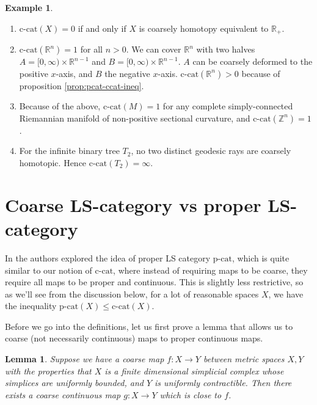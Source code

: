 \documentclass {amsart}
\newcommand {\ccat}     {\text{c-cat}}
\newcommand {\pcat}     {\text{p-cat}}
\newcommand {\R}        {\mathbb{R}}
\newcommand {\Z}        {\mathbb{Z}}
\newcommand {\Rplus}    {\mathbb{R}_{+}}
\newtheorem   {lemma}       [theorem] {Lemma}
\theoremstyle {definition}
\newtheorem   {example}  [theorem] {Example}
\begin{document}
\begin{example}
    \begin{enumerate}
        \item \( \ccat(X) = 0 \) if and only if \( X \) is coarsely homotopy
              equivalent to \( \Rplus \).
        \item \( \ccat(\R^{n}) = 1 \) for all \( n > 0 \). We can cover \( \R^{n} \)
              with two halves \( A= [0, \infty) \times \R^{n-1} \) and \( B = [0,
              \infty) \times \R^{n-1} \). \( A \) can be coarsely deformed to the
              positive \( x \)-axis, and \( B \) the negative \( x \)-axis. 
              \( \ccat( \R^{n} ) > 0 \) because of proposition \ref{prop:pcat-ccat-ineq}.
        \item Because of the above, \( \ccat (M) = 1 \) for any complete
              simply-connected Riemannian manifold of non-positive sectional 
              curvature, and \( \ccat(\Z^{n}) = 1 \).
        \item For the infinite binary tree \( T_2 \), no two distinct geodesic rays
              are coarsely homotopic. Hence \( \ccat(T_2) = \infty \).
    \end{enumerate}
\end{example}

\section {Coarse LS-category vs proper LS-category}

In \cite{ayalaLusternikSchnirelmannInvariantsProper1992} the authors explored
the idea of proper LS category \( \pcat \), which is quite similar to our notion
of \( \ccat \), where instead of requiring maps to be coarse, they require all
maps to be proper and continuous. This is slightly less restrictive, so as we'll
see from the discussion below, for a lot of reasonable spaces \( X \), we have the
inequality \( \pcat(X) \leq \ccat(X) \).

Before we go into the definitions, let us first prove a lemma that allows us to
 coarse (not necessarily continuous) maps to proper continuous
maps.

\begin{lemma}
    \label{lem:coarse-to-proper}
    Suppose we have a coarse map \( f : X \to Y \) between metric spaces \( X,Y \)
    with the properties that \( X \) is a finite dimensional simplicial complex
    whose simplices are uniformly bounded, and \( Y \) is uniformly contractible.
    Then there exists a coarse continuous map \( g : X \to Y \) which is 
    close to \( f \).
\end{lemma}
\end{document}
